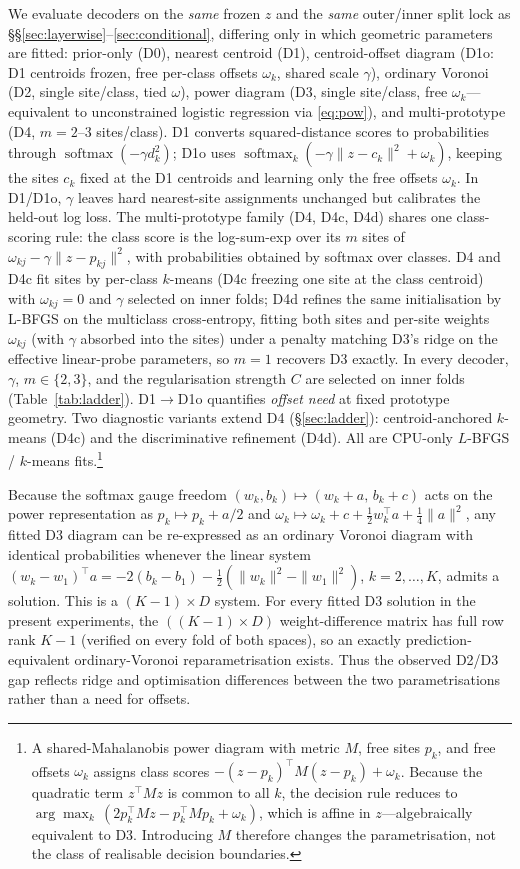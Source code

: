 \documentclass[11pt]{article}
\begin{document}
We evaluate decoders on the \emph{same} frozen $z$ and the \emph{same} outer/inner split lock as \S\S\ref{sec:layerwise}--\ref{sec:conditional}, differing only in which geometric parameters are fitted: prior-only (D0), nearest centroid (D1), centroid-offset diagram (D1o: D1 centroids frozen, free per-class offsets $\omega_k$, shared scale $\gamma$), ordinary Voronoi (D2, single site/class, tied $\omega$), power diagram (D3, single site/class, free $\omega_{k}$---equivalent to unconstrained logistic regression via \eqref{eq:pow}), and multi-prototype (D4, $m=2$--$3$ sites/class). D1 converts squared-distance scores to probabilities through $\operatorname{softmax}(-\gamma d_k^2)$; D1o uses $\operatorname{softmax}_k(-\gamma\|z-c_k\|^2+\omega_k)$, keeping the sites $c_k$ fixed at the D1 centroids and learning only the free offsets $\omega_k$. In D1/D1o, $\gamma$ leaves hard nearest-site assignments unchanged but calibrates the held-out log loss. The multi-prototype family (D4, D4c, D4d) shares one class-scoring rule: the class score is the log-sum-exp over its $m$ sites of $\omega_{kj}-\gamma\|z-p_{kj}\|^{2}$, with probabilities obtained by softmax over classes. D4 and D4c fit sites by per-class $k$-means (D4c freezing one site at the class centroid) with $\omega_{kj}=0$ and $\gamma$ selected on inner folds; D4d refines the same initialisation by L-BFGS on the multiclass cross-entropy, fitting both sites and per-site weights $\omega_{kj}$ (with $\gamma$ absorbed into the sites) under a penalty matching D3's ridge on the effective linear-probe parameters, so $m{=}1$ recovers D3 exactly. In every decoder, $\gamma$, $m\in\{2,3\}$, and the regularisation strength $C$ are selected on inner folds (Table~\ref{tab:ladder}). D1$\to$D1o quantifies \emph{offset need} at fixed prototype geometry. Two diagnostic variants extend D4 (\S\ref{sec:ladder}): centroid-anchored $k$-means (D4c) and the discriminative refinement (D4d). All are CPU-only $L$-BFGS / $k$-means fits.\footnote{A shared-Mahalanobis power diagram with metric $M$, free sites $p_k$, and free offsets $\omega_k$ assigns class scores $-(z-p_k)^\top\!M(z-p_k)+\omega_k$. Because the quadratic term $z^\top\!Mz$ is common to all $k$, the decision rule reduces to $\arg\max_k\,(2p_k^\top\!Mz - p_k^\top\!Mp_k + \omega_k)$, which is affine in $z$---algebraically equivalent to D3. Introducing $M$ therefore changes the parametrisation, not the class of realisable decision boundaries.}

Because the softmax gauge freedom $(w_k,b_k)\mapsto(w_k+a,\,b_k+c)$ acts on the power representation as $p_k\mapsto p_k+a/2$ and $\omega_k\mapsto\omega_k+c+\tfrac12 w_k^\top a+\tfrac14\|a\|^2$, any fitted D3 diagram can be re-expressed as an ordinary Voronoi diagram with identical probabilities whenever the linear system $(w_k-w_1)^\top a=-2(b_k-b_1)-\tfrac12(\|w_k\|^2-\|w_1\|^2)$, $k=2,\dots,K$, admits a solution. This is a $(K-1)\times D$ system. For every fitted D3 solution in the present experiments, the $((K-1)\times D)$ weight-difference matrix has full row rank $K-1$ (verified on every fold of both spaces), so an exactly prediction-equivalent ordinary-Voronoi reparametrisation exists. Thus the observed D2/D3 gap reflects ridge and optimisation differences between the two parametrisations rather than a need for offsets.
\end{document}
